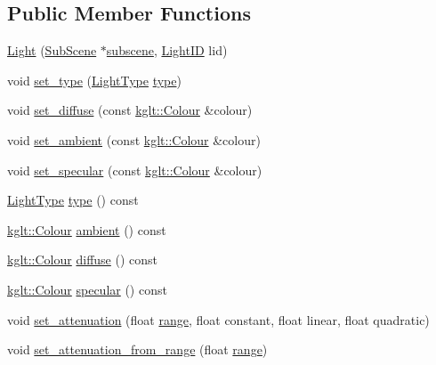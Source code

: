 \subsection*{Public Member Functions}
\begin{DoxyCompactItemize}
\item 
\hyperlink{classkglt_1_1_light_ac2349ea362a253c7c1b5688e27801c4d}{Light} (\hyperlink{classkglt_1_1_sub_scene}{Sub\-Scene} $\ast$\hyperlink{classkglt_1_1_object_a857d97844a3a56aeb8f0a180b7cf592f}{subscene}, \hyperlink{namespacekglt_ab90464803ef8e3c1f6da41388e859968}{Light\-I\-D} lid)
\item 
void \hyperlink{classkglt_1_1_light_a304251b2720784076af75ba4f11cb3db}{set\-\_\-type} (\hyperlink{namespacekglt_a4bc8798d811754c195cce0451b54ac0d}{Light\-Type} \hyperlink{classkglt_1_1_light_aa74fdb53245897cdf24c30682da534b8}{type})
\item 
void \hyperlink{classkglt_1_1_light_aaa5808efe9ca7e2dc6422d29565e60ab}{set\-\_\-diffuse} (const \hyperlink{structkglt_1_1_colour}{kglt\-::\-Colour} \&colour)
\item 
void \hyperlink{classkglt_1_1_light_aa70383db2fad65cedb19f53c43560b04}{set\-\_\-ambient} (const \hyperlink{structkglt_1_1_colour}{kglt\-::\-Colour} \&colour)
\item 
void \hyperlink{classkglt_1_1_light_aa31429d3713eb4e3b0ecce824a6bb2fe}{set\-\_\-specular} (const \hyperlink{structkglt_1_1_colour}{kglt\-::\-Colour} \&colour)
\item 
\hyperlink{namespacekglt_a4bc8798d811754c195cce0451b54ac0d}{Light\-Type} \hyperlink{classkglt_1_1_light_aa74fdb53245897cdf24c30682da534b8}{type} () const 
\item 
\hyperlink{structkglt_1_1_colour}{kglt\-::\-Colour} \hyperlink{classkglt_1_1_light_a72e414625e2f85c56bfc3e35ea48d46e}{ambient} () const 
\item 
\hyperlink{structkglt_1_1_colour}{kglt\-::\-Colour} \hyperlink{classkglt_1_1_light_ad692b90aa04da35e75eb61c51cfe8db6}{diffuse} () const 
\item 
\hyperlink{structkglt_1_1_colour}{kglt\-::\-Colour} \hyperlink{classkglt_1_1_light_a71aae921606eb745f4a8840747b6c28d}{specular} () const 
\item 
void \hyperlink{classkglt_1_1_light_a9f31d9ad916a67ff226b4f51d7593683}{set\-\_\-attenuation} (float \hyperlink{classkglt_1_1_light_a2800e919426652e682190344175575a8}{range}, float constant, float linear, float quadratic)
\item 
void \hyperlink{classkglt_1_1_light_a2fbc17df0ec1fdffd9219efaf27f9aec}{set\-\_\-attenuation\-\_\-from\-\_\-range} (float \hyperlink{classkglt_1_1_light_a2800e919426652e682190344175575a8}{range})

\end{DoxyCompactItemize}

